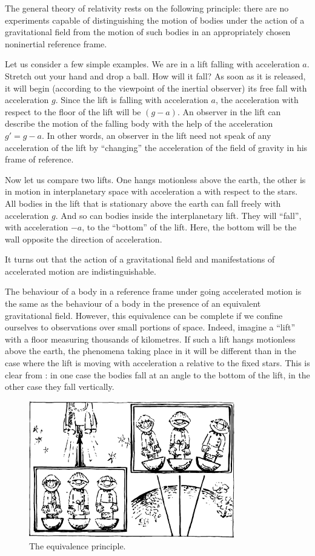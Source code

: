 The general theory of relativity rests on the following principle: there are no experiments capable of distin­guishing the motion of bodies under the action of a grav­itational field from the motion of such bodies in an appropriately chosen noninertial reference frame.

Let us consider a few simple examples. We are in a lift falling with acceleration $a$. Stretch out your hand and drop a ball. How will it fall? As soon as it is released, it will begin (according to the viewpoint of the inertial observer) its free fall with acceleration $g$. Since the lift is falling with acceleration $a$, the acceleration with re­spect to the floor of the lift will be $(g-a)$. An observer in the lift can describe the motion of the falling body with the help of the acceleration $g'=g-a$. In other words, an observer in the lift need not speak of any acceleration of the lift by ``changing'' the acceleration of the field of gravity in his frame of reference.

Now let us compare two lifts. One hangs motionless above the earth, the other is in motion in interplanetary space with acceleration a with respect to the stars. All bodies in the lift that is stationary above the earth can fall freely with acceleration $g$. And so can bodies inside the interplanetary lift. They will ``fall'', with acceleration $-a$, to the ``bottom'' of the lift. Here, the bottom will be the wall opposite the direction of acceleration.

It turns out that the action of a gravitational field and manifestations of accelerated motion are indistin­guishable.

The behaviour of a body in a reference frame under­ going accelerated motion is the same as the behaviour of a body in the presence of an equivalent gravitational field. However, this equivalence can be complete if we confine ourselves to observations over small portions of space. Indeed, imagine a ``lift'' with a floor measuring thousands of kilometres. If such a lift hangs motionless above the earth, the phenomena taking place in it will be different than in the case where the lift is moving with acceleration a relative to the fixed stars. This is clear from : in one case the bodies fall at an angle to the bottom of the lift, in the other case they fall verti­cally.

\begin{figure}[!ht]
\centering
\includegraphics[width=0.8\textwidth]{figures/fig-07-03.pdf}
\caption{The equivalence principle.}
\label{fig-7.3}
\end{figure}

